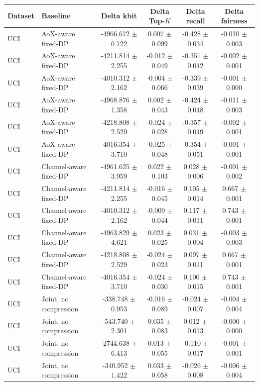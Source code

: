 \begin{tabular}{llcccc}
\toprule
Dataset & Baseline & Delta kbit & Delta Top-$K$ & Delta recall & Delta fairness \\
\midrule
UCI & AoX-aware fixed-DP & -4966.672 $\pm$ 0.722 & 0.007 $\pm$ 0.099 & -0.428 $\pm$ 0.034 & -0.010 $\pm$ 0.003 \\
UCI & AoX-aware fixed-DP & -4211.814 $\pm$ 2.255 & -0.012 $\pm$ 0.049 & -0.351 $\pm$ 0.042 & -0.002 $\pm$ 0.001 \\
UCI & AoX-aware fixed-DP & -4010.312 $\pm$ 2.162 & -0.004 $\pm$ 0.066 & -0.339 $\pm$ 0.039 & -0.001 $\pm$ 0.000 \\
UCI & AoX-aware fixed-DP & -4968.876 $\pm$ 1.358 & 0.002 $\pm$ 0.043 & -0.424 $\pm$ 0.048 & -0.011 $\pm$ 0.003 \\
UCI & AoX-aware fixed-DP & -4218.808 $\pm$ 2.529 & -0.024 $\pm$ 0.028 & -0.357 $\pm$ 0.049 & -0.002 $\pm$ 0.001 \\
UCI & AoX-aware fixed-DP & -4016.354 $\pm$ 3.710 & -0.025 $\pm$ 0.048 & -0.354 $\pm$ 0.051 & -0.001 $\pm$ 0.001 \\
UCI & Channel-aware fixed-DP & -4961.625 $\pm$ 3.959 & 0.022 $\pm$ 0.103 & 0.028 $\pm$ 0.006 & -0.001 $\pm$ 0.002 \\
UCI & Channel-aware fixed-DP & -4211.814 $\pm$ 2.255 & -0.016 $\pm$ 0.045 & 0.105 $\pm$ 0.014 & 0.667 $\pm$ 0.001 \\
UCI & Channel-aware fixed-DP & -4010.312 $\pm$ 2.162 & -0.009 $\pm$ 0.044 & 0.117 $\pm$ 0.011 & 0.743 $\pm$ 0.001 \\
UCI & Channel-aware fixed-DP & -4963.829 $\pm$ 4.621 & 0.023 $\pm$ 0.025 & 0.031 $\pm$ 0.004 & -0.003 $\pm$ 0.003 \\
UCI & Channel-aware fixed-DP & -4218.808 $\pm$ 2.529 & -0.024 $\pm$ 0.023 & 0.097 $\pm$ 0.011 & 0.667 $\pm$ 0.001 \\
UCI & Channel-aware fixed-DP & -4016.354 $\pm$ 3.710 & -0.024 $\pm$ 0.030 & 0.100 $\pm$ 0.015 & 0.743 $\pm$ 0.001 \\
UCI & Joint, no compression & -338.748 $\pm$ 0.953 & -0.016 $\pm$ 0.089 & -0.024 $\pm$ 0.007 & -0.004 $\pm$ 0.004 \\
UCI & Joint, no compression & -543.740 $\pm$ 2.301 & 0.035 $\pm$ 0.083 & 0.012 $\pm$ 0.013 & -0.000 $\pm$ 0.000 \\
UCI & Joint, no compression & -2744.638 $\pm$ 6.413 & 0.013 $\pm$ 0.055 & -0.110 $\pm$ 0.017 & -0.001 $\pm$ 0.001 \\
UCI & Joint, no compression & -340.952 $\pm$ 1.422 & 0.033 $\pm$ 0.058 & -0.026 $\pm$ 0.008 & -0.006 $\pm$ 0.004 \\

\end{tabular}
